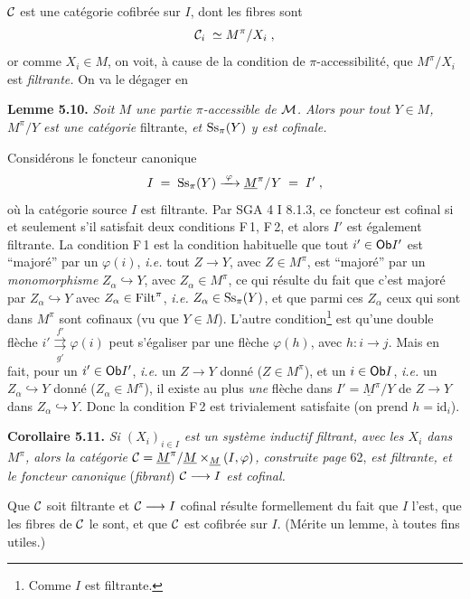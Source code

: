 $\mathcal{C}$ est une catégorie cofibrée sur $I$, dont les fibres sont
\[
\mathcal{C}_i \;\simeq M^\pi/X_i \;,
\]
or comme $X_i \in M$, on voit, à cause de la condition de $\pi$-accessibilité, que $M^\pi/X_i$ est \textit{filtrante.} On va le dégager en

\textbf{Lemme 5.10.} \textit{Soit $M$ une partie $\pi$-accessible de $\mathcal{M}$. Alors pour tout $Y \in M$, $M^\pi/Y$ est une catégorie} filtrante, \textit{et $\mathrm{Ss}_\pi(Y)$ y est cofinale.}


Considérons le foncteur canonique
\[
I \;=\; \mathrm{Ss}_\pi(Y) \xrightarrow{\;\varphi\;} \underline{M}^\pi/Y \;=\; I' \;,
\]
où la catégorie source $I$ est filtrante. Par SGA 4 I 8.1.3, ce foncteur est cofinal si et seulement s'il satisfait deux conditions F\,1, F\,2, et alors $I'$ est également filtrante. La condition F\,1 est la condition habituelle que tout $i' \in \mathsf{Ob} I'$ est “majoré” par un $\varphi(i)$, \textit{i.e.} tout $Z \longrightarrow Y$, avec $Z \in M^\pi$, est “majoré” par un \textit{monomorphisme} $Z_\alpha \hookrightarrow Y$, avec $Z_\alpha \in M^\pi$, ce qui résulte du fait que c'est majoré par $Z_\alpha \hookrightarrow Y$ avec $Z_\alpha \in \mathrm{Filt}^\pi$, \textit{i.e.} $Z_\alpha \in \mathrm{Ss}_\pi(Y)$, et que parmi ces $Z_\alpha$ ceux qui sont dans $M^\pi$ sont cofinaux (vu que $Y \in M$). L'autre condition\footnote[23]{Comme $I$ est filtrante.} est qu'une double flèche $i' \overset{f'}{\underset{g'}{\rightrightarrows}} \varphi(i)$ peut
s'égaliser par une flèche $\varphi(h)$, avec $h : i \longrightarrow j$. Mais en fait, pour un $i' \in \mathsf{Ob} I'$, \textit{i.e.} un $Z \longrightarrow Y$ donné ($Z \in M^\pi$), et un $i \in \mathsf{Ob} I$, \textit{i.e.} un $Z_\alpha \hookrightarrow Y$ donné ($Z_\alpha \in M^\pi$), il existe au plus \textit{une} flèche dans $I' = \underline{M}^\pi/Y$ de $Z \longrightarrow Y$ dans $Z_\alpha \hookrightarrow Y$. Donc la condition F\,2 est trivialement satisfaite (on prend $h = \mathrm{id}_i$).

\textbf{Corollaire 5.11.} \textit{Si $(X_i)_{i \in I}$ est un système inductif filtrant, avec les $X_i$ dans $M^\pi$, alors la catégorie $\mathcal{C} = \underline{M}^\pi/\underline{M} \times_{\underline{M}} (I,\varphi)$, construite page} 62, \textit{est filtrante, et le foncteur canonique} (\textit{fibrant}) \textit{$\mathcal{C} \longrightarrow I$ est cofinal.}

Que $\mathcal{C}$ soit filtrante et $\mathcal{C} \longrightarrow I$ cofinal résulte formellement du fait que $I$ l'est, que les fibres de $\mathcal{C}$ le sont, et que $\mathcal{C}$ est cofibrée sur $I$. (Mérite un lemme, à toutes fins utiles.)

